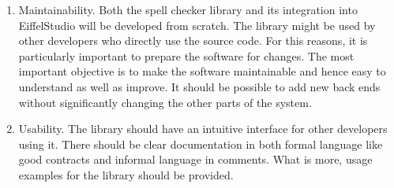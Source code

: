 \documentclass[paper=a4]{scrartcl}
\begin{document}
\begin{enumerate}

\item Maintainability. Both the spell checker library and its integration into EiffelStudio will be developed from scratch. The library might be used by other developers who directly use the source code. For this reasons, it is particularly important to prepare the software for changes. The most important objective is to make the software maintainable and hence easy to understand as well as improve. It should be possible to add new back ends without significantly changing the other parts of the system.

\item Usability. The library should have an intuitive interface for other developers using it. There should be clear documentation in both formal language like good contracts and informal language in comments. What is more, usage examples for the library should be provided.

\end{enumerate}











\end{document}
